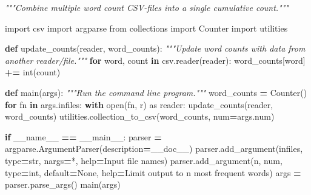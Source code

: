 \documentclass[
]{krantz}
\makeatletter
\newenvironment{Shaded}{\begin{snugshade}}{\end{snugshade}}
\newcommand{\BuiltInTok}[1]{#1}
\newcommand{\CommentTok}[1]{\textcolor[rgb]{0.56,0.35,0.01}{\textit{#1}}}
\newcommand{\ControlFlowTok}[1]{\textcolor[rgb]{0.13,0.29,0.53}{\textbf{#1}}}
\newcommand{\ImportTok}[1]{#1}
\newcommand{\KeywordTok}[1]{\textcolor[rgb]{0.13,0.29,0.53}{\textbf{#1}}}
\newcommand{\NormalTok}[1]{#1}
\newcommand{\OperatorTok}[1]{\textcolor[rgb]{0.81,0.36,0.00}{\textbf{#1}}}
\newcommand{\StringTok}[1]{\textcolor[rgb]{0.31,0.60,0.02}{#1}}
\newcommand{\VariableTok}[1]{\textcolor[rgb]{0.00,0.00,0.00}{#1}}
\newenvironment{kframe}{%
\medskip{}
\setlength{\fboxsep}{.8em}
 \def\at@end@of@kframe{}%
 \ifinner\ifhmode%
  \def\at@end@of@kframe{\end{minipage}}%
  \begin{minipage}{\columnwidth}%
 \fi\fi%
 \def\FrameCommand##1{\hskip\@totalleftmargin \hskip-\fboxsep
 \colorbox{shadecolor}{##1}\hskip-\fboxsep
     \hskip-\linewidth \hskip-\@totalleftmargin \hskip\columnwidth}%
 \MakeFramed {\advance\hsize-\width
   \@totalleftmargin\z@ \linewidth\hsize
   \@setminipage}}%
 {\par\unskip\endMakeFramed%
 \at@end@of@kframe}
\renewenvironment{Shaded}{\begin{kframe}}{\end{kframe}}
\makeatother
\begin{document}
\begin{Shaded}
\begin{Highlighting}[]
\CommentTok{"""Combine multiple word count CSV{-}files into a single cumulative count."""}

\ImportTok{import}\NormalTok{ csv}
\ImportTok{import}\NormalTok{ argparse}
\ImportTok{from}\NormalTok{ collections }\ImportTok{import}\NormalTok{ Counter}
\ImportTok{import}\NormalTok{ utilities}


\KeywordTok{def}\NormalTok{ update\_counts(reader, word\_counts):}
    \CommentTok{"""Update word counts with data from another reader/file."""}
    \ControlFlowTok{for}\NormalTok{ word, count }\KeywordTok{in}\NormalTok{ csv.reader(reader):}
\NormalTok{        word\_counts[word] }\OperatorTok{+=} \BuiltInTok{int}\NormalTok{(count)}


\KeywordTok{def}\NormalTok{ main(args):}
    \CommentTok{"""Run the command line program."""}
\NormalTok{    word\_counts }\OperatorTok{=}\NormalTok{ Counter()}
    \ControlFlowTok{for}\NormalTok{ fn }\KeywordTok{in}\NormalTok{ args.infiles:}
        \ControlFlowTok{with} \BuiltInTok{open}\NormalTok{(fn, }\StringTok{\textquotesingle{}r\textquotesingle{}}\NormalTok{) }\ImportTok{as}\NormalTok{ reader:}
\NormalTok{            update\_counts(reader, word\_counts)}
\NormalTok{    utilities.collection\_to\_csv(word\_counts, num}\OperatorTok{=}\NormalTok{args.num)}


\ControlFlowTok{if} \VariableTok{\_\_name\_\_} \OperatorTok{==} \StringTok{\textquotesingle{}\_\_main\_\_\textquotesingle{}}\NormalTok{:}
\NormalTok{    parser }\OperatorTok{=}\NormalTok{ argparse.ArgumentParser(description}\OperatorTok{=}\NormalTok{\_\_doc\_\_)}
\NormalTok{    parser.add\_argument(}\StringTok{\textquotesingle{}infiles\textquotesingle{}}\NormalTok{, }\BuiltInTok{type}\OperatorTok{=}\BuiltInTok{str}\NormalTok{, nargs}\OperatorTok{=}\StringTok{\textquotesingle{}*\textquotesingle{}}\NormalTok{, }\BuiltInTok{help}\OperatorTok{=}\StringTok{\textquotesingle{}Input file names\textquotesingle{}}\NormalTok{)}
\NormalTok{    parser.add\_argument(}\StringTok{\textquotesingle{}{-}n\textquotesingle{}}\NormalTok{, }\StringTok{\textquotesingle{}{-}{-}num\textquotesingle{}}\NormalTok{, }\BuiltInTok{type}\OperatorTok{=}\BuiltInTok{int}\NormalTok{, default}\OperatorTok{=}\VariableTok{None}\NormalTok{,}
                        \BuiltInTok{help}\OperatorTok{=}\StringTok{\textquotesingle{}Limit output to n most frequent words\textquotesingle{}}\NormalTok{)}
\NormalTok{    args }\OperatorTok{=}\NormalTok{ parser.parse\_args()}
\NormalTok{    main(args)}
\end{Highlighting}
\end{Shaded}
\end{document}
